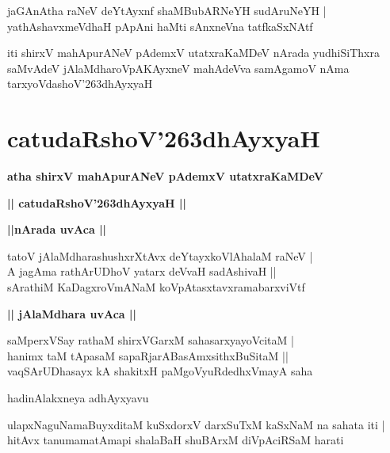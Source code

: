 \documentclass[twoside,12pt,openright]{book}
\def\S{\char'263}
\newcounter{shloka}[chapter]
\def\uvaca#1{\centerline{{\large\textbf{#1}}}}
\begin{document}
\begin{shloka}%
jaGAnAtha raNeV deYtAyxnf shaMBubARNeYH sudAruNeYH |\\
yathAshavxmeVdhaH pApAni haMti sAnxneVna tatfkaSxNAtf
\end{shloka}

\begin{center}
iti shirxV mahApurANeV pAdemxV utatxraKaMDeV  nArada yudhiSiThxra saMvAdeV jAlaMdharoVpAKAyxneV mahAdeVva  
samAgamoV nAma tarxyoVdashoV\S dhAyxyaH 
\end{center}

\chapter{catudaRshoV\S dhAyxyaH}

\begin{center}
{\LARGE\bfseries atha shirxV mahApurANeV pAdemxV utatxraKaMDeV} 
\end{center}

\begin{center}
{\LARGE\bfseries  || catudaRshoV\S dhAyxyaH ||}
\end{center}

\uvaca{||nArada uvAca ||}

\begin{shloka}%
tatoV jAlaMdharashushxrXtAvx deYtayxkoVlAhalaM raNeV |\\
A jagAma rathArUDhoV yatarx deVvaH sadAshivaH ||\\
sArathiM KaDagxroVmANaM koVpAtasxtavxramabarxviVtf
\end{shloka}

\uvaca{|| jAlaMdhara uvAca ||}

\begin{shloka}%
saMperxVSay rathaM shirxVGarxM sahasarxyayoVcitaM |\\
hanimx taM tApasaM sapaRjarABasAmxsithxBuSitaM ||\\
vaqSArUDhasayx kA shakitxH paMgoVyuRdedhxVmayA saha 
\end{shloka}

\begin{center}
hadinAlakxneya adhAyxyavu
\end{center}

\begin{shloka}%
ulapxNaguNamaBuyxditaM kuSxdorxV darxSuTxM kaSxNaM na sahata iti |\\
hitAvx tanumamatAmapi shalaBaH shuBArxM diVpAciRSaM harati 
\end{shloka}
\end{document}

